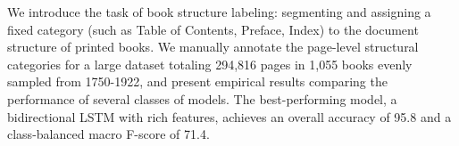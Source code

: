 We introduce the task of book structure labeling: segmenting and assigning a fixed category (such as Table of Contents, Preface, Index) to the document structure of printed books.  We manually annotate the page-level structural categories for a large dataset totaling 294,816 pages in 1,055 books evenly sampled from 1750-1922, and present empirical results comparing the performance of several classes of models.  The best-performing model, a bidirectional LSTM with rich features, achieves an overall accuracy of 95.8 and a class-balanced macro F-score of 71.4.
